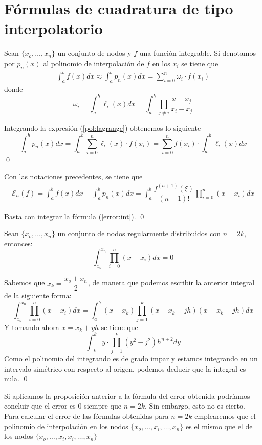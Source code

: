 \section{Fórmulas de cuadratura de tipo interpolatorio}
\begin{prop}
Sean $\{x_o,\ldots,x_n\}$ un conjunto de nodos y $f$ una función integrable. Si denotamos por $p_n(x)$ al polinomio de interpolación de $f$ en los $x_i$ se tiene que
\begin{align}
\int_a^bf(x)dx\approx\int_a^bp_n(x)dx=\sum_{i=0}^n\omega_i\cdot f(x_i)
\label{form:int}
\end{align}
donde 
$$\omega_i=\int_a^b\ell_i(x)dx=\int_a^b\prod_{j\neq i}\dfrac{x-x_j}{x_i-x_j}$$
\end{prop}
\begin{dem}
Integrando la expresión (\ref{pol:lagrange}) obtenemos lo siguiente
$$\int_a^bp_n(x)dx=\int_a^b\sum_{i=0}^n\ell_i(x)\cdot f(x_i)=\sum_{i=0}^n f(x_i)\cdot\int_a^b\ell_i(x)dx$$
\qed\end{dem}
\begin{prop}
Con las notaciones precedentes, se tiene que
\begin{align}
\mathcal{E}_n(f)=\int_a^bf(x)dx-\int_a^bp_n(x)dx=\int_a^b\dfrac{f^{(n+1)}(\xi)}{(n+1)!}\prod_{i=0}^n(x-x_i)dx
\label{error:integ}
\end{align}
\end{prop}
\begin{dem}
Basta con integrar la fórmula (\ref{error:int}).
\qed\end{dem}
 \begin{prop}
 Sean $\{x_o,\ldots,x_n\}$ un conjunto de nodos regularmente distribuidos con \newline$n=2k$, entonces:
 $$\int_{x_o}^{x_n}\prod_{i=0}^n(x-x_i)dx=0$$
 \end{prop}
 \begin{dem}
Sabemos que $x_k=\dfrac{x_o+x_n}{2}$, de manera que podemos escribir la anterior integral de la siguiente forma:
$$\int_{x_o}^{x_n}\prod_{i=0}^n(x-x_i)dx=\int_a^b(x-x_k)\prod_{j=1}^k(x-x_k-jh)(x-x_k+jh)dx$$
Y tomando ahora $x=x_k+yh$ se tiene que
$$\int_{-k}^ky\cdot \prod_{j=1}^k(y^2-j^2)h^{n+2}dy$$
Como el polinomio del integrando es de grado impar y estamos integrando en un intervalo simétrico con respecto al origen, podemos deducir que la integral es nula.
\qed\end{dem}
\begin{obs}
Si aplicamos la proposición anterior a la fórmula del error obtenida podríamos concluir que el error es $0$ siempre que $n=2k$. Sin embargo, esto no es cierto. Para calcular el error de las fórmulas obtenidas para $n=2k$ emplearemos que el polinomio de interpolación en los nodos $\{x_o,\ldots,x_i,\ldots,x_n\}$ es el mismo que el de los nodos $\{x_o,\ldots,x_i,x_i,\ldots,x_n\}$
\end{obs}
